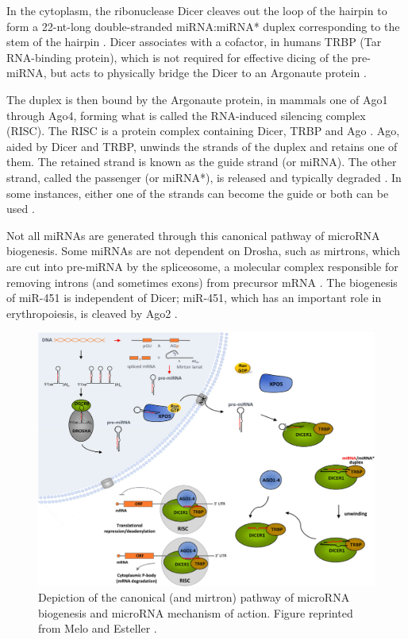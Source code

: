 In the cytoplasm, the ribonuclease Dicer cleaves out the loop of the hairpin
to form a 22-nt-long double-stranded miRNA:miRNA* duplex corresponding to
the stem of the hairpin \citep{Bernstein2001}.
Dicer associates with a cofactor, in humans TRBP (Tar RNA-binding protein),
which is not required for effective dicing of the pre-miRNA,
but acts to physically bridge the Dicer to an Argonaute protein
\citep{Chendrimada2005}.

The duplex is then bound by the Argonaute protein, in mammals one of Ago1
through Ago4, forming what is called the RNA-induced silencing complex (RISC).
The RISC is a protein complex containing Dicer, TRBP and Ago \citep{Gregory2005}.
Ago, aided by Dicer and TRBP, unwinds the strands of the duplex and retains one of
them. The retained strand is known as the guide strand (or miRNA). The other
strand, called the passenger (or miRNA*), is released and typically degraded \citep{Du2005}.
In some instances, either one of the strands can become the guide
or both can be used \citep{Czech2009}.

Not all miRNAs are generated through this canonical pathway of microRNA
biogenesis. Some miRNAs are not dependent on Drosha, such as mirtrons, which
are cut into pre-miRNA by the spliceosome, a molecular complex responsible for
removing introns (and sometimes exons) from precursor mRNA \citep{Ruby2007}. The
biogenesis of miR-451 is independent of Dicer; miR-451, which
has an important role in erythropoiesis, is cleaved by Ago2 \citep{Cheloufi2010}.

\begin{figure}[htb]
  \centering
  \includegraphics[width=1\linewidth]{figures/miRNA_biogenesis.png}
  \caption{Depiction of the canonical (and mirtron) pathway of microRNA biogenesis
  and microRNA mechanism of action. Figure reprinted from Melo and Esteller \citep{Melo2011}.}
  \label{fig:mirna-biogenesis}
\end{figure}




